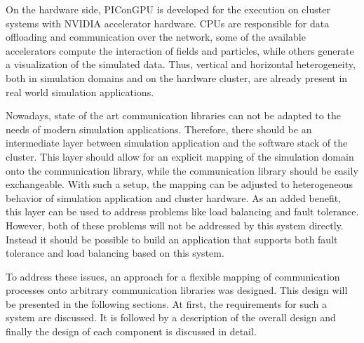 On the hardware side, PIConGPU is developed for the execution on
cluster systems with NVIDIA accelerator hardware.  CPUs are
responsible for data offloading and communication over the network,
some of the available accelerators compute the interaction of fields
and particles, while others generate a visualization of the simulated
data. Thus, vertical and horizontal heterogeneity, both in simulation
domains and on the hardware cluster, are already present in real world
simulation applications.

Nowadays, state of the art communication libraries can not be adapted
to the needs of modern simulation applications.  Therefore, there
should be an intermediate layer between simulation application and the
software stack of the cluster. This layer should allow for an explicit
mapping of the simulation domain onto the communication library, while
the communication library should be easily exchangeable. With such a
setup, the mapping can be adjusted to heterogeneous behavior of
simulation application and cluster hardware.  As an added benefit,
this layer can be used to address problems like load balancing and
fault tolerance. However, both of these problems will not be addressed
by this system directly. Instead it should be possible to build an
application that supports both fault tolerance and load balancing
based on this system.

To address these issues, an approach for a flexible mapping of
communication processes onto arbitrary communication libraries was
designed. This design will be presented in the following
sections. At first, the requirements for such a system are
discussed. It is followed by a description of the overall design and
finally the design of each component is discussed in detail.


